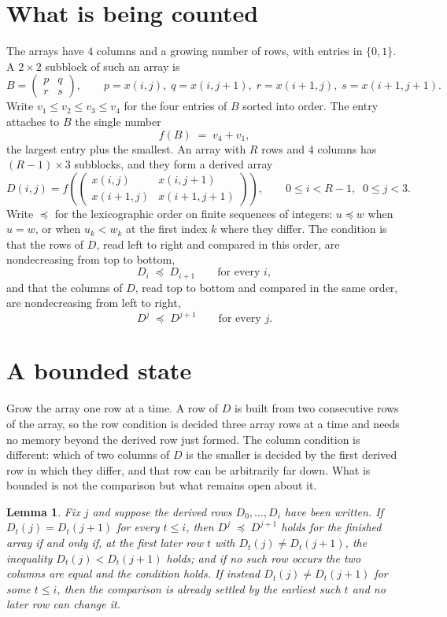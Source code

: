\documentclass[11pt,a4paper]{article}
\theoremstyle{plain}
\newtheorem{lemma}[theorem]{Lemma}
\theoremstyle{definition}
\begin{document}
\section{What is being counted}

The arrays have $4$ columns and a growing number of rows, with entries in $\{0,1\}$. A
$2\times2$ subblock of such an array is
\[
B=\begin{pmatrix} p & q \\ r & s \end{pmatrix},
\qquad p=x(i,j),\; q=x(i,j+1),\; r=x(i+1,j),\; s=x(i+1,j+1).
\]
Write $v_1\le v_2\le v_3\le v_4$ for the four entries of $B$ sorted into order. The entry attaches to $B$ the single number
\[
f(B)\;=\;v_4+v_1,
\]
the largest entry plus the smallest. An array with $R$ rows and $4$ columns has $(R-1)\times3$ subblocks, and they
form a derived array
\[
D(i,j)=f\!\left(\begin{pmatrix} x(i,j) & x(i,j+1) \\ x(i+1,j) & x(i+1,j+1)\end{pmatrix}
\right),\qquad 0\le i<R-1,\;\; 0\le j<3 .
\]
Write $\preceq$ for the lexicographic order on finite sequences of integers: $u\preceq w$ when
$u=w$, or when $u_k<w_k$ at the first index $k$ where they differ. The condition is that the
rows of $D$, read left to right and compared in this order, are nondecreasing from top to bottom,
\[
D_{i}\;\preceq\;D_{i+1}\qquad\text{for every } i,
\]
and that the columns of $D$, read top to bottom and compared in the same order, are nondecreasing
from left to right,
\[
D^{j}\;\preceq\;D^{j+1}\qquad\text{for every } j .
\]

\section{A bounded state}

Grow the array one row at a time. A row of $D$ is built from two consecutive rows of the array,
so the row condition is decided three array rows at a time and needs no memory beyond the
derived row just formed. The column condition is different: which of two columns of $D$ is the
smaller is decided by the first derived row in which they differ, and that row can be
arbitrarily far down. What is bounded is not the comparison but what remains open about it.

\begin{lemma}\label{lem:bits}
Fix $j$ and suppose the derived rows $D_0,\dots,D_i$ have been written. If $D_t(j)=D_t(j+1)$ for
every $t\le i$, then $D^{j}\;\preceq\;D^{j+1}$ holds for the finished array if and only if,
at the first later row $t$ with $D_t(j)\neq D_t(j+1)$, the inequality $D_t(j)<D_t(j+1)$
holds; and if no such row occurs the two columns are equal and the condition holds. If instead
$D_t(j)\neq D_t(j+1)$ for some $t\le i$, then the comparison is already settled by the earliest
such $t$ and no later row can change it.
\end{lemma}
\end{document}
